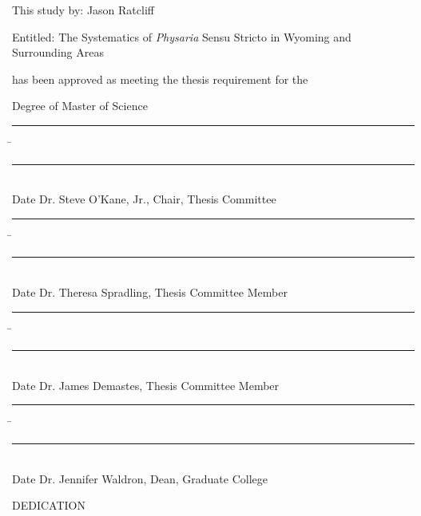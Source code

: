 \clearpage
\pagestyle{contents}  %
\setcounter{page}{2}  %

This study by: Jason Ratcliff

Entitled: The Systematics of \textit{Physaria} Sensu Stricto in Wyoming and
Surrounding Areas

\vspace*{24pt}

has been approved as meeting the thesis requirement for the

Degree of Master of Science

\vspace*{24pt}

\singlespacing

\begin{noindent}
\begin{tabbing}
\rule{1.25in}{0.4pt}\hspace{0.75in}\=\rule{4in}{0.4pt}\\
Date \> Dr. Steve O'Kane, Jr., Chair, Thesis Committee\\
\end{tabbing}

\begin{tabbing}
\rule{1.25in}{0.4pt}\hspace{0.75in}\=\rule{4in}{0.4pt}\\
Date \> Dr. Theresa Spradling, Thesis Committee Member\\
\end{tabbing}

\begin{tabbing}
\rule{1.25in}{0.4pt}\hspace{0.75in}\=\rule{4in}{0.4pt}\\
Date \> Dr. James Demastes, Thesis Committee Member\\
\end{tabbing}

\begin{tabbing}
\rule{1.25in}{0.4pt} \hspace{0.75in}\=\rule{4in}{0.4pt}\\
Date \> Dr. Jennifer Waldron, Dean, Graduate College\\
\end{tabbing}
\end{noindent}

\doublespacing

\clearpage
\thispagestyle{empty}
\begin{center}
DEDICATION
\end{center}

